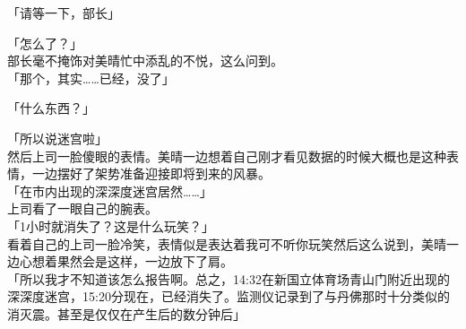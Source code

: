 「请等一下，部长」

「怎么了？」\\

部长毫不掩饰对美晴忙中添乱的不悦，这么问到。\\

「那个，其实……已经，没了」

「什么东西？」

「所以说迷宫啦」\\

然后上司一脸傻眼的表情。美晴一边想着自己刚才看见数据的时候大概也是这种表情，一边摆好了架势准备迎接即将到来的风暴。\\

「在市内出现的深深度迷宫居然……」\\

上司看了一眼自己的腕表。\\

「1小时就消失了？这是什么玩笑？」\\

看着自己的上司一脸冷笑，表情似是表达着我可不听你玩笑然后这么说到，美晴一边心想着果然会是这样，一边放下了肩。\\

「所以我才不知道该怎么报告啊。总之，14:32在新国立体育场青山门附近出现的深深度迷宫，15:20分现在，已经消失了。监测仪记录到了与丹佛那时十分类似的消灭震。甚至是仅仅在产生后的数分钟后」\\

